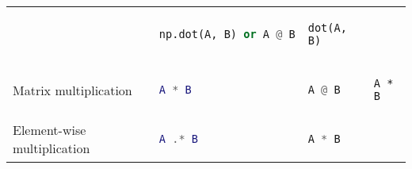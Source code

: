 \documentclass[10pt, landscape]{article}
\begin{document}
\begin{multicols}{2}
\begin{tabular}[]{@{}llll@{}}
\begin{minipage}[t]{0.22\columnwidth}
\end{minipage} & \begin{minipage}[t]{0.23\columnwidth}\raggedright
\begin{lstlisting}[language=Python]
np.dot(A, B) or A @ B
\end{lstlisting}

\end{minipage} & \begin{minipage}[t]{0.20\columnwidth}\raggedright
\begin{lstlisting}
dot(A, B)
\end{lstlisting}

\end{minipage}\tabularnewline
\begin{minipage}[t]{0.23\columnwidth}\raggedright
Matrix multiplication
\end{minipage} & \begin{minipage}[t]{0.22\columnwidth}\raggedright
\begin{lstlisting}[language=Matlab]
A * B
\end{lstlisting}

\end{minipage} & \begin{minipage}[t]{0.23\columnwidth}\raggedright
\begin{lstlisting}[language=Python]
A @ B
\end{lstlisting}

\end{minipage} & \begin{minipage}[t]{0.20\columnwidth}\raggedright
\begin{lstlisting}
A * B
\end{lstlisting}

\end{minipage}\tabularnewline
\begin{minipage}[t]{0.23\columnwidth}\raggedright
Element-wise multiplication
\end{minipage} & \begin{minipage}[t]{0.22\columnwidth}\raggedright
\begin{lstlisting}[language=Matlab]
A .* B
\end{lstlisting}

\end{minipage} & \begin{minipage}[t]{0.23\columnwidth}\raggedright
\begin{lstlisting}[language=Python]
A * B
\end{lstlisting}


\end{minipage}
\end{tabular}
\end{multicols}
\end{document}
